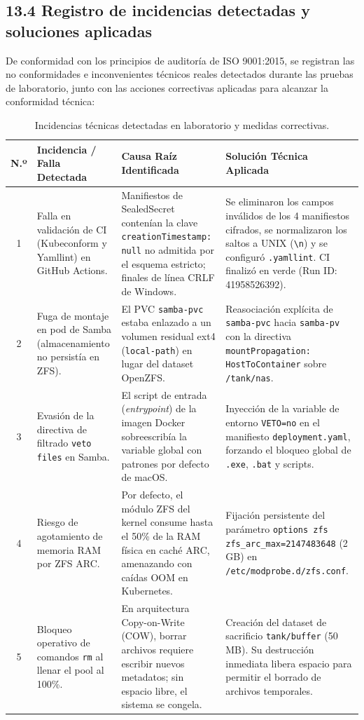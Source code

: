 \documentclass[10pt,a4paper]{article}
\begin{document}
\subsection{13.4 Registro de incidencias detectadas y soluciones aplicadas}
De conformidad con los principios de auditoría de ISO 9001:2015, se registran las no conformidades e inconvenientes técnicos reales detectados durante las pruebas de laboratorio, junto con las acciones correctivas aplicadas para alcanzar la conformidad técnica:

\begin{table}[htbp]
\centering
\small
\caption{Incidencias técnicas detectadas en laboratorio y medidas correctivas.}
\label{tab:incidencias_soluciones}
\begin{tabular}{|c|p{4cm}|p{4.5cm}|p{4.8cm}|}
\hline
\textbf{\textsf{N.º}} & \textbf{\textsf{Incidencia / Falla Detectada}} & \textbf{\textsf{Causa Raíz Identificada}} & \textbf{\textsf{Solución Técnica Aplicada}} \\
\hline
1 & Falla en validación de CI (Kubeconform y Yamllint) en GitHub Actions. & Manifiestos de SealedSecret contenían la clave \texttt{creationTimestamp: null} no admitida por el esquema estricto; finales de línea CRLF de Windows. & Se eliminaron los campos inválidos de los 4 manifiestos cifrados, se normalizaron los saltos a UNIX (\texttt{\textbackslash{}n}) y se configuró \texttt{.yamllint}. CI finalizó en verde (Run ID: 41958526392). \\
\hline
2 & Fuga de montaje en pod de Samba (almacenamiento no persistía en ZFS). & El PVC \texttt{samba-pvc} estaba enlazado a un volumen residual ext4 (\texttt{local-path}) en lugar del dataset OpenZFS. & Reasociación explícita de \texttt{samba-pvc} hacia \texttt{samba-pv} con la directiva \texttt{mountPropagation: HostToContainer} sobre \texttt{/tank/nas}. \\
\hline
3 & Evasión de la directiva de filtrado \texttt{veto files} en Samba. & El script de entrada (\textit{entrypoint}) de la imagen Docker sobreescribía la variable global con patrones por defecto de macOS. & Inyección de la variable de entorno \texttt{VETO=no} en el manifiesto \texttt{deployment.yaml}, forzando el bloqueo global de \texttt{.exe}, \texttt{.bat} y scripts. \\
\hline
4 & Riesgo de agotamiento de memoria RAM por ZFS ARC. & Por defecto, el módulo ZFS del kernel consume hasta el 50\% de la RAM física en caché ARC, amenazando con caídas OOM en Kubernetes. & Fijación persistente del parámetro \texttt{options zfs zfs\_arc\_max=2147483648} (2 GB) en \texttt{/etc/modprobe.d/zfs.conf}. \\
\hline
5 & Bloqueo operativo de comandos \texttt{rm} al llenar el pool al 100\%. & En arquitectura Copy-on-Write (COW), borrar archivos requiere escribir nuevos metadatos; sin espacio libre, el sistema se congela. & Creación del dataset de sacrificio \texttt{tank/buffer} (50 MB). Su destrucción inmediata libera espacio para permitir el borrado de archivos temporales. \\
\hline
\end{tabular}
\end{table}
\end{document}
